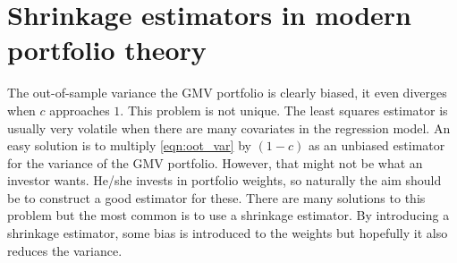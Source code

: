 \documentclass[12pt, oneside]{book}\usepackage{knitr}
\begin{document}
{\section{Shrinkage estimators in modern portfolio theory}
The out-of-sample variance the GMV portfolio is clearly biased, it even diverges when $c$ approaches $1$.
This problem is not unique.
The least squares estimator is usually very volatile when there are many covariates in the regression model. 
An easy solution is to multiply \eqref{eqn:oot_var} by $(1-c)$ as an unbiased estimator for the variance of the GMV portfolio.
However, that might not be what an investor wants.
He/she invests in portfolio weights, so naturally the aim should be to construct a good estimator for these.
There are many solutions to this problem but the most common is to use a shrinkage estimator.
By introducing a shrinkage estimator, some bias is introduced to the weights but hopefully it also reduces the variance.

}
\end{document}
